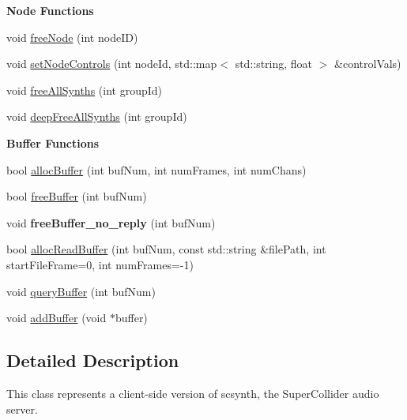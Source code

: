 \begin{Indent}{\bf Node Functions}
\begin{DoxyCompactItemize}
\item 
void \hyperlink{classsc_1_1SCServer_ac2c5c3092d2ba8781f2bb0f91ccaf7cd}{free\-Node} (int node\-I\-D)
\item 
void \hyperlink{classsc_1_1SCServer_a41296f0d6d948ada6a7509e767cabeb0}{set\-Node\-Controls} (int node\-Id, std\-::map$<$ std\-::string, float $>$ \&control\-Vals)
\item 
void \hyperlink{classsc_1_1SCServer_a8e5460d2e8b184f35c648c688e1b31f3}{free\-All\-Synths} (int group\-Id)
\item 
void \hyperlink{classsc_1_1SCServer_a8739643e0aa244661e41f229aca329ba}{deep\-Free\-All\-Synths} (int group\-Id)
\end{DoxyCompactItemize}
\end{Indent}
\begin{Indent}{\bf Buffer Functions}\par
\begin{DoxyCompactItemize}
\item 
bool \hyperlink{classsc_1_1SCServer_a4a93b0de3cabaed3a4c32327f08b1d58}{alloc\-Buffer} (int buf\-Num, int num\-Frames, int num\-Chans)
\item 
bool \hyperlink{classsc_1_1SCServer_a5e89d3374fd704cea3110894c9c62b07}{free\-Buffer} (int buf\-Num)
\item 
\hypertarget{classsc_1_1SCServer_a00ce072fc88c75aa6885da7a652701a9}{void {\bfseries free\-Buffer\-\_\-no\-\_\-reply} (int buf\-Num)}\label{classsc_1_1SCServer_a00ce072fc88c75aa6885da7a652701a9}

\item 
bool \hyperlink{classsc_1_1SCServer_a3d03cd0dd763f2f575d6a84da55609bf}{alloc\-Read\-Buffer} (int buf\-Num, const std\-::string \&file\-Path, int start\-File\-Frame=0, int num\-Frames=-\/1)
\item 
void \hyperlink{classsc_1_1SCServer_acbd0a404dbd4e2cc98e46d088643908b}{query\-Buffer} (int buf\-Num)
\item 
void \hyperlink{classsc_1_1SCServer_ade0d2a48713efbce6494ad0bae42a839}{add\-Buffer} (void $\ast$buffer)
\end{DoxyCompactItemize}
\end{Indent}


\subsection{Detailed Description}
This class represents a client-\/side version of scsynth, the Super\-Collider audio server. 

